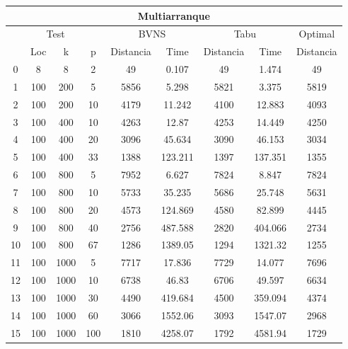 \begin{center}
	\begin{adjustbox}{max width=\textwidth}
	\begin{tabular}{|c|c|c|c|c|c|c|c|c|} \hline
		\multicolumn{9}{|c|}{Multiarranque} \\ \hline
		\multicolumn{4}{|c|}{Test}& \multicolumn{2}{c}{BVNS} & \multicolumn{2}{|c|}{Tabu} & Optimal \\ \hline
		   & Loc & k    & p   & Distancia& Time    & Distancia& Time    & Distancia \\ \hline
		0  & 8   & 8    & 2   & 49       & 0.107   & 49       & 1.474   & 49        \\ \hline
		1  & 100 & 200  & 5   & 5856     & 5.298   & 5821     & 3.375   & 5819      \\ \hline
		2  & 100 & 200  & 10  & 4179     & 11.242  & 4100     & 12.883  & 4093      \\ \hline
		3  & 100 & 400  & 10  & 4263     & 12.87   & 4253     & 14.449  & 4250      \\ \hline
		4  & 100 & 400  & 20  & 3096     & 45.634  & 3090     & 46.153  & 3034      \\ \hline
		5  & 100 & 400  & 33  & 1388     & 123.211 & 1397     & 137.351 & 1355      \\ \hline
		6  & 100 & 800  & 5   & 7952     & 6.627   & 7824     & 8.847   & 7824      \\ \hline
		7  & 100 & 800  & 10  & 5733     & 35.235  & 5686     & 25.748  & 5631      \\ \hline
		8  & 100 & 800  & 20  & 4573     & 124.869 & 4580     & 82.899  & 4445      \\ \hline
		9  & 100 & 800  & 40  & 2756     & 487.588 & 2820     & 404.066 & 2734      \\ \hline
		10 & 100 & 800  & 67  & 1286     & 1389.05 & 1294     & 1321.32 & 1255      \\ \hline
		11 & 100 & 1000 & 5   & 7717     & 17.836  & 7729     & 14.077  & 7696      \\ \hline
		12 & 100 & 1000 & 10  & 6738     & 46.83   & 6706     & 49.597  & 6634      \\ \hline
		13 & 100 & 1000 & 30  & 4490     & 419.684 & 4500     & 359.094 & 4374      \\ \hline
		14 & 100 & 1000 & 60  & 3066     & 1552.06 & 3093     & 1547.07 & 2968      \\ \hline
		15 & 100 & 1000 & 100 & 1810     & 4258.07 & 1792     & 4581.94 & 1729      \\ \hline

\end{tabular}
\end{adjustbox}
\end{center}
